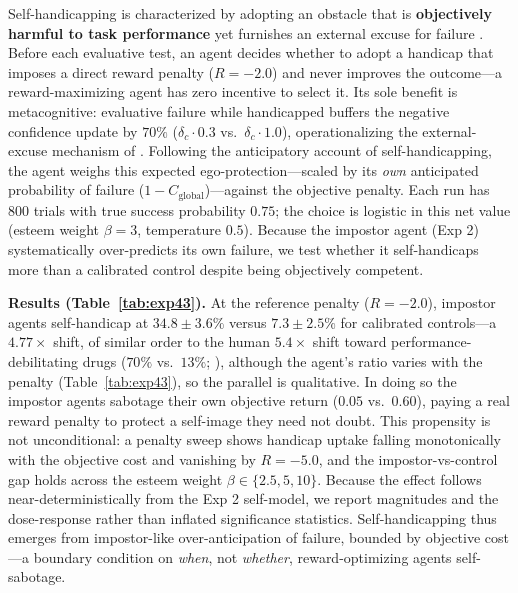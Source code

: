 \documentclass[conference]{IEEEtran}
\begin{document}
Self-handicapping is characterized by adopting an obstacle that is \textbf{objectively harmful to task performance} yet furnishes an external excuse for failure \citep{berglas1978drug}. Before each evaluative test, an agent decides whether to adopt a handicap that imposes a direct reward penalty ($R=-2.0$) and never improves the outcome---a reward-maximizing agent has zero incentive to select it. Its sole benefit is metacognitive: evaluative failure while handicapped buffers the negative confidence update by $70\%$ ($\delta_c\cdot0.3$ vs.\ $\delta_c\cdot1.0$), operationalizing the external-excuse mechanism of \citet{berglas1978drug}. Following the anticipatory account of self-handicapping, the agent weighs this expected ego-protection---scaled by its \textit{own} anticipated probability of failure ($1-C_{\text{global}}$)---against the objective penalty. Each run has 800 trials with true success probability $0.75$; the choice is logistic in this net value (esteem weight $\beta=3$, temperature $0.5$). Because the impostor agent (Exp 2) systematically over-predicts its own failure, we test whether it self-handicaps more than a calibrated control despite being objectively competent.

\textbf{Results (Table~\ref{tab:exp43}).} At the reference penalty ($R=-2.0$), impostor agents self-handicap at $34.8\pm3.6\%$ versus $7.3\pm2.5\%$ for calibrated controls---a $4.77\times$ shift, of similar order to the human $5.4\times$ shift toward performance-debilitating drugs ($70\%$ vs.\ $13\%$; \citet{berglas1978drug}), although the agent's ratio varies with the penalty (Table~\ref{tab:exp43}), so the parallel is qualitative. In doing so the impostor agents sabotage their own objective return ($0.05$ vs.\ $0.60$), paying a real reward penalty to protect a self-image they need not doubt. This propensity is not unconditional: a penalty sweep shows handicap uptake falling monotonically with the objective cost and vanishing by $R=-5.0$, and the impostor-vs-control gap holds across the esteem weight $\beta\in\{2.5,5,10\}$. Because the effect follows near-deterministically from the Exp 2 self-model, we report magnitudes and the dose-response rather than inflated significance statistics. Self-handicapping thus emerges from impostor-like over-anticipation of failure, bounded by objective cost---a boundary condition on \textit{when}, not \textit{whether}, reward-optimizing agents self-sabotage.
\end{document}

